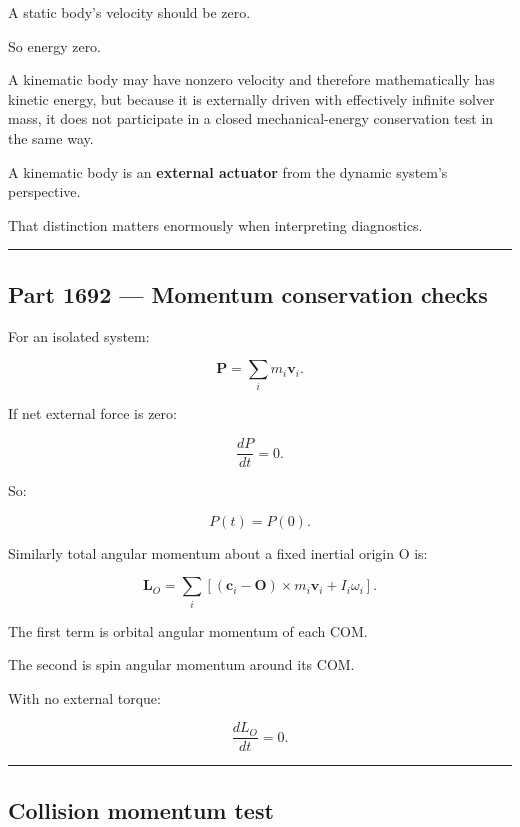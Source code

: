 A static body's velocity should be zero.

So energy zero.

A kinematic body may have nonzero velocity and therefore mathematically has kinetic energy, but because it is externally driven with effectively infinite solver mass, it does not participate in a closed mechanical-energy conservation test in the same way.

A kinematic body is an \textbf{external actuator} from the dynamic system's perspective.

That distinction matters enormously when interpreting diagnostics.

\begin{center}\rule{0.5\linewidth}{0.5pt}\end{center}

\subsection{Part 1692 --- Momentum conservation checks}\label{06-engine-ii-ch039-part-1692-momentum-conservation-checks}

For an isolated system:

\[
\boxed{
\mathbf P
=
\sum_i
m_i\mathbf v_i.
}
\]

If net external force is zero:

\[
\frac{dP}{dt}=0.
\]

So:

\[
P(t)=P(0).
\]

Similarly total angular momentum about a fixed inertial origin O is:

\[
\boxed{
\mathbf L_O
=
\sum_i
[
(\mathbf c_i-\mathbf O)\times m_i\mathbf v_i
+
I_i\omega_i
].
}
\]

The first term is orbital angular momentum of each COM.

The second is spin angular momentum around its COM.

With no external torque:

\[
\frac{dL_O}{dt}=0.
\]

\begin{center}\rule{0.5\linewidth}{0.5pt}\end{center}

\subsection{Collision momentum test}\label{06-engine-ii-ch039-collision-momentum-test}

